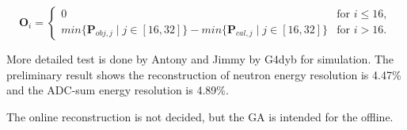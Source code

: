 \begin{equation}
\label{eq:fitnessOTimeOffset}
\mathbf{O}_i =
\left\{
    \begin{array}{ll}
    0 & \mbox{for } i\leq16, \\
    min\{\mathbf{P}_{obj,j}{\mid}j\in[16,32]\} - min\{\mathbf{P}_{cal,j}{\mid}j\in[16,32]\}  & \mbox{for } i>16.
    \end{array} \right.
\end{equation}


More detailed test is done by Antony and Jimmy by G4dyb for simulation.
The preliminary result shows the reconstruction of neutron energy resolution is 4.47\%
and the ADC-sum energy resolution is 4.89\%.


The online reconstruction is not decided, but the GA is intended for
the offline.
